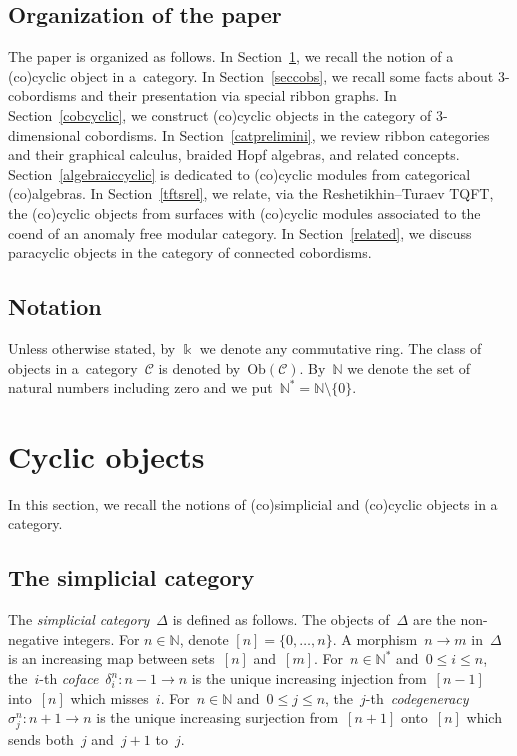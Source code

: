\documentclass[pdftex]{sigma}
\numberwithin{equation}{section}
\newcommand{\co}{\colon}
\newcommand{\fs}[1]{[#1]}
\newcommand{\mc}{\mathcal}
\newcommand{\N}{\mathbb{N}}
\newcommand{\Ob}[1]{\mathrm{Ob}(#1)}
\newcommand{\kk}{\Bbbk}
\begin{document}
\subsection{Organization of the paper}
The paper is organized as follows.
In Section~\ref{cyclicprelimini}, we recall the notion of a (co)cyclic object in a~category.
In Section~\ref{seccobs}, we recall some facts about $3$-cobordisms and their presentation via special ribbon graphs. In Section~\ref{cobcyclic}, we construct (co)cyclic objects in the category of $3$-dimensional cobordisms.
In Section~\ref{catprelimini}, we review ribbon categories and their graphical calculus, braided Hopf algebras, and related concepts.
Section~\ref{algebraiccyclic} is dedi\-cated to (co)cyclic modules from categorical (co)algebras.
In Section~\ref{tftsrel}, we relate, via the Reshetikhin--Turaev TQFT, the (co)cyclic objects from surfaces with (co)cyclic modules associated to the coend of an anomaly free modular category. In Section~\ref{related}, we discuss paracyclic objects in the category of connected cobordisms.


\subsection{Notation}
Unless otherwise stated, by $\kk$ we denote any commutative ring. The class of objects in a~category~$\mc C$ is denoted by~$\Ob{\mc C}$.
By~$\mathbb{N}$ we denote the set of natural numbers including zero and we put~$\mathbb{N}^* = \mathbb{N} \setminus \{0\}$.

\section{Cyclic objects} \label{cyclicprelimini}

In this section, we recall the notions of (co)simp\-li\-cial and (co)cyclic objects in a category.

\subsection{The simplicial category}
The \emph{simplicial category}~$\Delta$ is defined as follows.
The objects of~$\Delta$ are the non-negative integers. For $n\in \N$, denote $\fs{n}=\{0, \dots, n\}$.
A morphism~$n\to m$ in~$\Delta$ is an increasing map between sets~$\fs{n}$ and~$\fs{m}$.
For~$n\in \N^*$ and~$0\le i \le n$, the~$i$-th \emph{coface}~$\delta_i^n \co n-1 \to n$ is the unique increasing injection from~$\fs{n-1}$ into~$\fs{n}$ which misses~$i$.
For~$n\in \N$ and~$0\le j \le n$, the~$j$-th~\emph{codegene\-racy}~$\sigma_j^n \co n+1 \to n$ is the unique increasing surjection from~$\fs{n+1}$ onto~$\fs{n}$ which sends both~$j$ and~$j+1$ to~$j$.
\end{document}
